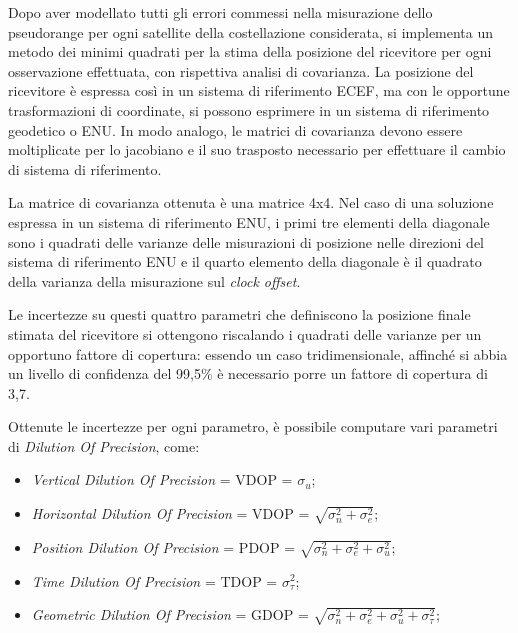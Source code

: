 \documentclass[a4paper,11pt,twoside]{book}
\begin{document}
	Dopo aver modellato tutti gli errori commessi nella misurazione dello pseudorange per ogni satellite della costellazione considerata, si implementa un metodo dei minimi quadrati per la stima della posizione del ricevitore per ogni osservazione effettuata, con rispettiva analisi di covarianza. La posizione del ricevitore è espressa così in un sistema di riferimento ECEF, ma con le opportune trasformazioni di coordinate, si possono esprimere in un sistema di riferimento geodetico o ENU. In modo analogo, le matrici di covarianza devono essere moltiplicate per lo jacobiano e il suo trasposto necessario per effettuare il cambio di sistema di riferimento.
	
	La matrice di covarianza ottenuta è una matrice 4x4. Nel caso di una soluzione espressa in un sistema di riferimento ENU, i primi tre elementi della diagonale sono i quadrati delle varianze delle misurazioni di posizione nelle direzioni del sistema di riferimento ENU e il quarto elemento della diagonale è il quadrato della varianza della misurazione sul \textit{clock offset}.
	
	Le incertezze su questi quattro parametri che definiscono la posizione finale stimata del ricevitore si ottengono riscalando i quadrati delle varianze per un opportuno fattore di copertura: essendo un caso tridimensionale, affinché si abbia un livello di confidenza del 99,5$\%$ è necessario porre un fattore di copertura di 3,7.
	
	Ottenute le incertezze per ogni parametro, è possibile computare vari parametri di \textit{Dilution Of Precision}, come:
	
	\begin{itemize}[-]
		\item \textit{Vertical Dilution Of Precision} = VDOP = $\sigma_u$;
		
		\item \textit{Horizontal Dilution Of Precision} = VDOP = $\sqrt{\sigma_n^2 + \sigma_e^2}$;
		
		\item \textit{Position Dilution Of Precision} = PDOP = $\sqrt{\sigma_n^2 + \sigma_e^2 + \sigma_u^2}$;
		
		\item \textit{Time Dilution Of Precision} = TDOP = $\sigma_{\tau}^2$;
		
		\item \textit{Geometric Dilution Of Precision} = GDOP = $\sqrt{\sigma_n^2 + \sigma_e^2 + \sigma_u^2 + \sigma_{\tau}^2}$;
		
	\end{itemize}
	
\end{document}
